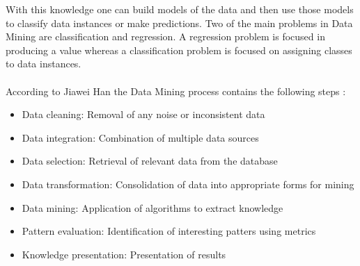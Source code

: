 \documentclass[11pt, oneside]{article}   	%
\begin{document}
With this knowledge one can build models of the data and then use those models to classify data instances or make predictions. Two of the main problems in Data Mining are classification and regression. A regression problem is focused in producing a value whereas a classification problem is focused on assigning classes to data instances.\\\\
According to Jiawei Han the Data Mining process contains the following steps \cite{Han:2005:DMC:1076797}:
\begin{itemize}
	\item Data cleaning: Removal of any noise or inconsistent data
	\item Data integration: Combination of multiple data sources
	\item Data selection: Retrieval of relevant data from the database
	\item Data transformation: Consolidation of data into appropriate forms for mining
	\item Data mining: Application of algorithms to extract knowledge
	\item Pattern evaluation: Identification of interesting patters using metrics
	\item Knowledge presentation: Presentation of results
\end{itemize}
\end{document}
